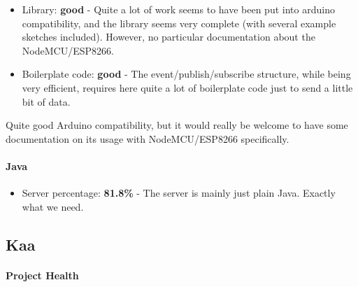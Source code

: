 \documentclass{article}
\begin{document}
\begin{itemize}
\item Library: \textbf{good} - Quite a lot of work seems to have been put into arduino compatibility, and the library seems very complete (with several example sketches included). However, no particular documentation about the NodeMCU/ESP8266.
\item Boilerplate code: \textbf{good} - The event/publish/subscribe structure, while being very efficient, requires here quite a lot of boilerplate code just to send a little bit of data.
\end{itemize}

Quite good Arduino compatibility, but it would really be welcome to have some documentation on its usage with NodeMCU/ESP8266 specifically.

\paragraph{Java} 

\begin{itemize}
\item Server percentage: \textbf{81.8\%} - The server is mainly just plain Java. Exactly what we need.
\end{itemize}

\subsection{Kaa}

\paragraph{Project Health}
\end{document}
